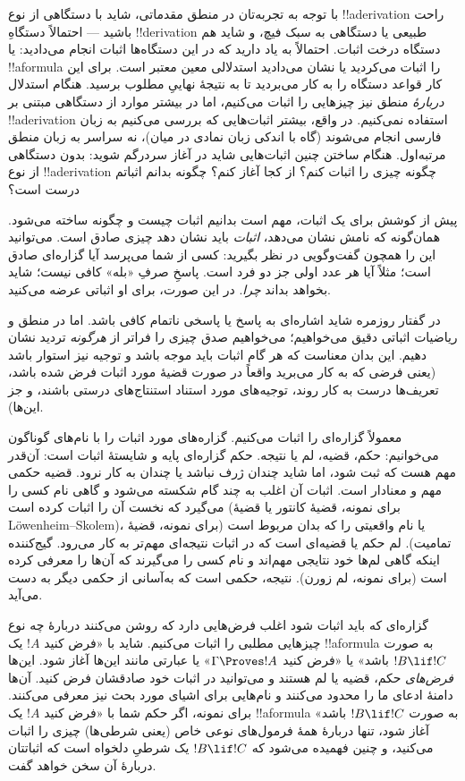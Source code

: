 \documentclass[../../../include/open-logic-section]{subfiles}
\begin{document}


با توجه به تجربه‌تان در منطق مقدماتی، شاید با دستگاهی از نوع
!!a{derivation} راحت باشید — احتمالاً دستگاهِ !!{derivation} طبیعی
یا دستگاهی به سبک فیچ، و شاید هم دستگاه درخت اثبات. احتمالاً به یاد
دارید که در این دستگاه‌ها اثبات انجام می‌دادید: یا !!a{formula} را
اثبات می‌کردید یا نشان می‌دادید استدلالی معین معتبر است. برای این
کار قواعد دستگاه را به کار می‌بردید تا به نتیجهٔ نهاییِ مطلوب
برسید. هنگام استدلال \emph{دربارهٔ} منطق نیز چیزهایی را اثبات
می‌کنیم، اما در بیشتر موارد از دستگاهی مبتنی بر !!a{derivation}
استفاده نمی‌کنیم. در واقع، بیشتر اثبات‌هایی که بررسی می‌کنیم به زبان
فارسی انجام می‌شوند (گاه با اندکی زبان نمادی در میان)، نه سراسر به
زبان منطق مرتبه‌اول. هنگام ساختن چنین اثبات‌هایی شاید در آغاز
سردرگم شوید: بدون دستگاهی از نوع !!a{derivation} چگونه چیزی را
اثبات کنم؟ از کجا آغاز کنم؟ چگونه بدانم اثباتم درست است؟

پیش از کوشش برای یک اثبات، مهم است بدانیم اثبات چیست و چگونه ساخته
می‌شود. همان‌گونه که نامش نشان می‌دهد، \emph{اثبات} باید نشان دهد
چیزی صادق است. می‌توانید این را همچون گفت‌وگویی در نظر بگیرید: کسی
از شما می‌پرسد آیا گزاره‌ای صادق است؛ مثلاً آیا هر عدد اولی جز دو
فرد است. پاسخِ صرفِ «بله» کافی نیست؛ شاید بخواهد بداند \emph{چرا}.
در این صورت، برای او اثباتی عرضه می‌کنید.

در گفتار روزمره شاید اشاره‌ای به پاسخ یا پاسخی ناتمام کافی باشد.
اما در منطق و ریاضیات اثباتی دقیق می‌خواهیم؛ می‌خواهیم صدق چیزی را
فراتر از \emph{هرگونه} تردید نشان دهیم. این بدان معناست که هر گام
اثبات باید موجه باشد و توجیه نیز استوار باشد (یعنی فرضی که به کار
می‌برید واقعاً در صورت قضیهٔ مورد اثبات فرض شده باشد، تعریف‌ها
درست به کار روند، توجیه‌های مورد استناد استنتاج‌های درستی باشند، و
جز این‌ها).

معمولاً گزاره‌ای را اثبات می‌کنیم. گزاره‌های مورد اثبات را با
نام‌های گوناگون می‌خوانیم: حکم، قضیه، لم یا نتیجه. حکم گزاره‌ای پایه
و شایستهٔ اثبات است: آن‌قدر مهم هست که ثبت شود، اما شاید چندان ژرف
نباشد یا چندان به کار نرود. قضیه حکمی مهم و معنادار است. اثبات آن
اغلب به چند گام شکسته می‌شود و گاهی نام کسی را می‌گیرد که نخست آن
را اثبات کرده است (برای نمونه، قضیهٔ کانتور یا قضیهٔ
L\"owenheim--Skolem)، یا نام واقعیتی را که بدان مربوط است (برای
نمونه، قضیهٔ تمامیت). لم حکم یا قضیه‌ای است که در اثبات نتیجه‌ای
مهم‌تر به کار می‌رود. گیج‌کننده اینکه گاهی لم‌ها خود نتایجی مهم‌اند
و نام کسی را می‌گیرند که آن‌ها را معرفی کرده است (برای نمونه، لم
زورن). نتیجه، حکمی است که به‌آسانی از حکمی دیگر به دست می‌آید.

گزاره‌ای که باید اثبات شود اغلب فرض‌هایی دارد که روشن می‌کنند
دربارهٔ چه نوع چیزهایی مطلبی را اثبات می‌کنیم. شاید با «فرض کنید
$!A$ یک !!a{formula} به صورت $!B \lif !C$ باشد» یا «فرض کنید
$\Gamma \Proves !A$» یا عبارتی مانند این‌ها آغاز شود. این‌ها
\emph{فرض‌های} حکم، قضیه یا لم هستند و می‌توانید در اثبات خود
صادقشان فرض کنید. آن‌ها دامنهٔ ادعای ما را محدود می‌کنند و
نام‌هایی برای اشیای مورد بحث نیز معرفی می‌کنند. برای نمونه، اگر حکم
شما با «فرض کنید $!A$ یک !!a{formula} به صورت
$!B \lif !C$ باشد» آغاز شود، تنها دربارهٔ همهٔ فرمول‌های نوعی خاص
(یعنی شرطی‌ها) چیزی را اثبات می‌کنید، و چنین فهمیده می‌شود که
$!B \lif !C$ یک شرطیِ دلخواه است که اثباتتان دربارهٔ آن سخن خواهد
گفت.
\end{document}
